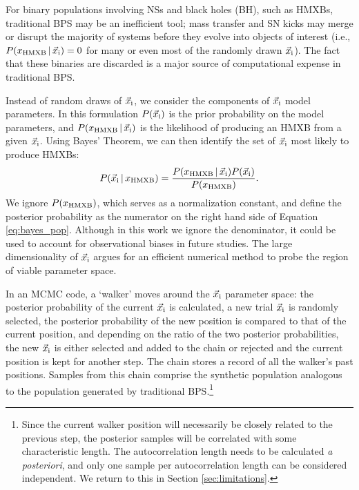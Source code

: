 \documentclass[usenatbib]{mnras}
\newcommand{\given}{\,|\,}
\begin{document}
For binary populations involving NSs and black holes (BH), such as HMXBs, traditional BPS may be an inefficient tool; mass transfer and SN kicks may merge or disrupt the majority of systems before they evolve into objects of interest (i.e., $P(x_{\rm HMXB} \given \vec{x}_{\rm i}) = 0$ for many or even most of the randomly drawn $\vec{x}_{\rm i}$). The fact that these binaries are discarded is a major source of computational expense in traditional BPS. 







Instead of random draws of $\vec{x}_{\rm i}$, we consider the components of $\vec{x}_{\rm i}$ model parameters. In this formulation $P(\vec{x}_{\rm i})$ is the prior probability on the model parameters, and $P(x_{\rm HMXB} \given \vec{x}_{\rm i})$ is the likelihood of producing an HMXB from a given $\vec{x}_{\rm i}$. Using Bayes' Theorem, we can then identify the set of $\vec{x}_{\rm i}$ most likely to produce HMXBs:
\begin{equation}
P(\vec{x}_{\rm i} \given x_{\rm HMXB}) = \frac{P(x_{\rm HMXB} \given \vec{x}_{\rm i}) P(\vec{x}_{\rm i})} {P(x_{\rm HMXB})}. \label{eq:bayes_pop}
\end{equation}
We ignore $P(x_{\rm HMXB})$, which serves as a normalization constant, and define the posterior probability as the numerator on the right hand side of Equation \ref{eq:bayes_pop}. Although in this work we ignore the denominator, it could be used to account for observational biases in future studies. The large dimensionality of $\vec{x}_{\rm i}$ argues for an efficient numerical method to probe the region of viable parameter space.


In an MCMC code, a `walker' moves around the $\vec{x}_{\rm i}$ parameter space: the posterior probability of the current $\vec{x}_{\rm i}$ is calculated, a new trial $\vec{x}_{\rm i}$ is randomly selected, the posterior probability of the new position is compared to that of the current position, and depending on the ratio of the two posterior probabilities, the new $\vec{x}_{\rm i}$ is either selected and added to the chain or rejected and the current position is kept for another step. The chain stores a record of all the walker's past positions. Samples from this chain comprise the synthetic population analogous to the population generated by traditional BPS.\footnote{Since the current walker position will necessarily be closely related to the previous step, the posterior samples will be correlated with some characteristic length. The autocorrelation length needs to be calculated {\it a posteriori}, and only one sample per autocorrelation length can be considered independent. We return to this in Section \ref{sec:limitations}.}
\end{document}
